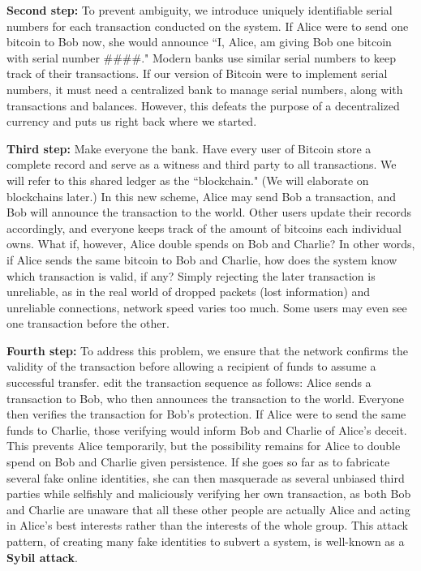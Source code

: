 \documentclass[full.tex]{subfiles}
\begin{document}
    \textbf{Second step:} To prevent ambiguity, we introduce uniquely identifiable serial numbers for each transaction conducted on the system. If Alice were to send one bitcoin to Bob now, she would announce ``I, Alice, am giving Bob one bitcoin with serial number \#\#\#\#." Modern banks use similar serial numbers to keep track of their transactions. If our version of Bitcoin were to implement serial numbers, it must need a centralized bank to manage serial numbers, along with transactions and balances. However, this defeats the purpose of a decentralized currency and puts us right back where we started.
    
    \textbf{Third step:} Make everyone the bank. Have every user of Bitcoin store a complete record and serve as a witness and third party to all transactions. We will refer to this shared ledger as the ``blockchain." (We will elaborate on blockchains later.) In this new scheme, Alice may send Bob a transaction, and Bob will announce the transaction to the world. Other users update their records accordingly, and everyone keeps track of the amount of bitcoins each individual owns. What if, \newpage
    \noindent however, Alice double spends on Bob and Charlie? In other words, if Alice sends the same bitcoin to Bob and Charlie, how does the system know which transaction is valid, if any? Simply  rejecting the later transaction is unreliable, as in the real world of dropped packets (lost information) and unreliable connections, network speed varies too much. Some users may even see one transaction before the other.
    
    \textbf{Fourth step:} To address this problem, we ensure that the network confirms the validity of the transaction before allowing a recipient of funds to assume a successful transfer. edit the transaction sequence as follows: Alice sends a transaction to Bob, who then announces the transaction to the world. Everyone then verifies the transaction for Bob's protection. If Alice were to send the same funds to Charlie, those verifying would inform Bob and Charlie of Alice's deceit. This prevents Alice temporarily, but the possibility remains for Alice to double spend on Bob and Charlie given persistence. If she goes so far as to fabricate several fake online identities, she can then masquerade as several unbiased third parties while selfishly and maliciously verifying her own transaction, as both Bob and Charlie are unaware that all these other people are actually Alice and acting in Alice's best interests rather than the interests of the whole group. This attack pattern, of creating many fake identities to subvert a system, is well-known as a \textbf{Sybil attack}.
    
\end{document}
